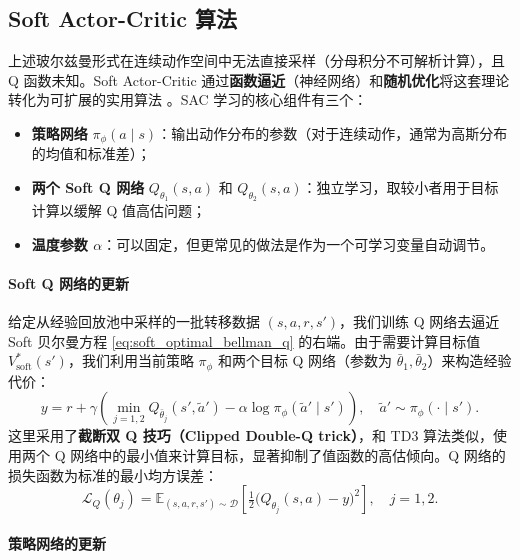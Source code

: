 \subsection{Soft Actor-Critic 算法}

上述玻尔兹曼形式在连续动作空间中无法直接采样（分母积分不可解析计算），且 Q 函数未知。Soft Actor-Critic 通过\textbf{函数逼近}（神经网络）和\textbf{随机优化}将这套理论转化为可扩展的实用算法 \cite{haarnoja2018soft,haarnoja2018sac_applications}。SAC 学习的核心组件有三个：
\begin{itemize}
\item \textbf{策略网络} $\pi_\phi(a \mid s)$：输出动作分布的参数（对于连续动作，通常为高斯分布的均值和标准差）；
\item \textbf{两个 Soft Q 网络} $Q_{\theta_1}(s, a)$ 和 $Q_{\theta_2}(s, a)$：独立学习，取较小者用于目标计算以缓解 Q 值高估问题；
\item \textbf{温度参数 $\alpha$}：可以固定，但更常见的做法是作为一个可学习变量自动调节。
\end{itemize}

\paragraph{Soft Q 网络的更新}

给定从经验回放池中采样的一批转移数据 $(s, a, r, s')$，我们训练 Q 网络去逼近 Soft 贝尔曼方程 \eqref{eq:soft_optimal_bellman_q} 的右端。由于需要计算目标值 $V^*_{\text{soft}}(s')$，我们利用当前策略 $\pi_\phi$ 和两个目标 Q 网络（参数为 $\bar\theta_1, \bar\theta_2$）来构造经验代价：
\begin{equation}
y = r + \gamma \left( \min_{j=1,2} Q_{\bar\theta_j}(s', \tilde a') - \alpha \log \pi_\phi(\tilde a' \mid s') \right), \quad \tilde a' \sim \pi_\phi(\cdot \mid s').
\label{eq:sac_target}
\end{equation}
这里采用了\textbf{截断双 Q 技巧（Clipped Double-Q trick）}，和 TD3 算法类似，使用两个 Q 网络中的最小值来计算目标，显著抑制了值函数的高估倾向。Q 网络的损失函数为标准的最小均方误差：
\begin{equation}
\mathcal{L}_Q(\theta_j) = \mathbb{E}_{(s,a,r,s') \sim \mathcal{D}} \left[ \tfrac{1}{2} \big( Q_{\theta_j}(s, a) - y \big)^2 \right], \quad j=1,2.
\label{eq:sac_q_loss}
\end{equation}

\paragraph{策略网络的更新}


